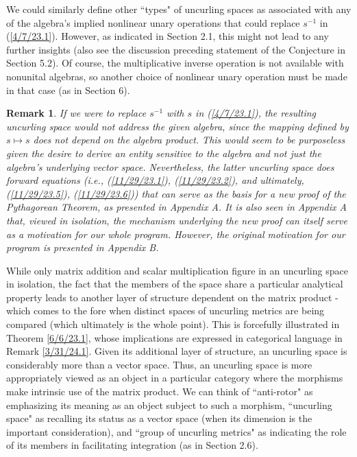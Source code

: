 \documentclass{amsart}
\numberwithin{equation}{section}
\newtheorem{remark}[theorem]{Remark}
\theoremstyle{definition}
\numberwithin{theorem}{section}
\begin{document}
 We could similarly define other ``types" of uncurling spaces as associated with any of the algebra's implied nonlinear unary operations that could replace $s^{-1}$ in (\ref{4/7/23.1}). However, as indicated in Section 2.1, this might not lead to any further insights (also see the discussion preceding statement of the Conjecture in Section 5.2).  Of course, the multiplicative inverse operation is not available with nonunital algebras, so another choice of nonlinear unary operation must be made in that case (as in Section 6).    
 
 
\begin{remark}\label{11/21/23.1} {\rm If we were to replace $s^{-1}$ with $s$ in (\ref{4/7/23.1}), the resulting uncurling space would not address the given algebra, since the mapping defined by $s\mapsto s$ does not depend on the algebra product.  This would seem to be purposeless given the desire to derive an entity sensitive to the algebra and not just the algebra's underlying vector space.  Nevertheless, the latter uncurling space does forward equations (i.e., (\ref{11/29/23.1}), (\ref{11/29/23.2}), and ultimately, (\ref{11/29/23.5}), (\ref{11/29/23.6})) that can serve as the basis for a new proof of the Pythagorean Theorem, as presented in Appendix A.  It is also seen in Appendix A that, viewed in isolation, the mechanism underlying the new proof can itself serve as a motivation for our whole program.  However, the original motivation for our program is presented in Appendix B.  }\end{remark}
 
While only matrix addition and scalar multiplication figure in an uncurling space in isolation, the fact that the members of the space share a particular analytical property leads to another layer of structure dependent on the matrix product - which comes to the fore when distinct spaces of uncurling metrics are being compared (which ultimately is the whole point).  This is forcefully illustrated in Theorem \ref{6/6/23.1}, whose implications are expressed in categorical language in Remark \ref{3/31/24.1}. Given its additional layer of structure, an uncurling space is considerably more than a vector space.  Thus, an uncurling space is more appropriately viewed as an object in a particular category where the morphisms make intrinsic use of the matrix product.    
We can think of  ``anti-rotor" as emphasizing its meaning as an object subject to such a morphism, ``uncurling space" as recalling its status as a vector space (when its dimension is the important consideration), and ``group of uncurling metrics" as indicating the role of its members in facilitating integration (as in Section 2.6).
 
\end{document}
